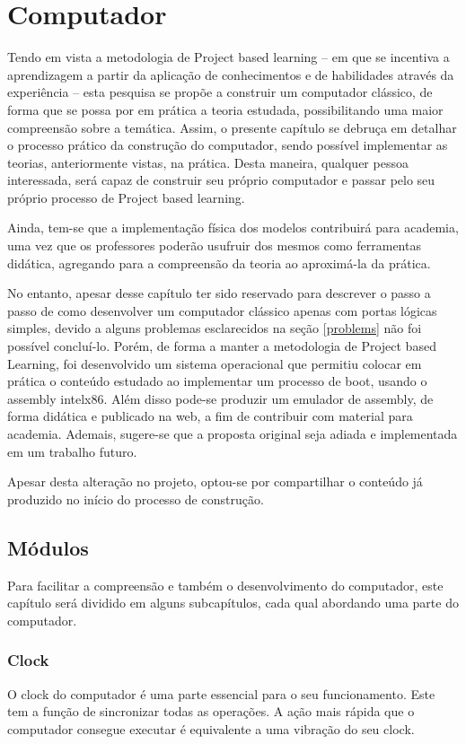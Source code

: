 \section{Computador} 
Tendo em vista a metodologia de Project based learning – em que se incentiva a aprendizagem a partir da aplicação de conhecimentos e de habilidades através da experiência – esta pesquisa se propõe a construir um computador clássico, de forma que se possa por em prática a teoria estudada, possibilitando uma maior compreensão sobre a temática. Assim, o presente capítulo se debruça em detalhar o processo prático da construção do computador, sendo possível implementar as teorias, anteriormente vistas, na prática. Desta maneira, qualquer pessoa interessada, será capaz de construir seu próprio computador e passar pelo seu próprio processo de Project based learning. 

Ainda, tem-se que a implementação física dos modelos contribuirá para academia, uma vez que os professores poderão usufruir dos mesmos como ferramentas didática, agregando para a compreensão da teoria ao aproximá-la da prática. 

No entanto, apesar desse capítulo ter sido reservado para descrever o passo a passo de como desenvolver um computador clássico apenas com portas lógicas simples, devido a alguns problemas esclarecidos na seção \ref{problems} não foi possível concluí-lo. Porém, de forma a manter a metodologia de Project based Learning, foi desenvolvido um sistema operacional que permitiu colocar em prática o conteúdo estudado ao implementar um processo de boot, usando o assembly intelx86. Além disso pode-se produzir um emulador de assembly, de forma didática e publicado na web,  a fim de contribuir com material para academia. Ademais, sugere-se que a proposta original seja adiada e implementada em um trabalho futuro. 

Apesar desta alteração no projeto, optou-se por compartilhar o conteúdo já produzido no início do processo de construção. 

\subsection{Módulos}
Para facilitar a compreensão e também o desenvolvimento do computador, este capítulo será dividido em alguns subcapítulos, cada qual abordando uma parte do computador.

\subsubsection{Clock}
O clock do computador é uma parte essencial para o seu funcionamento. Este tem a função de sincronizar todas as operações. A ação mais rápida que o computador consegue executar é equivalente a uma vibração do seu clock.

